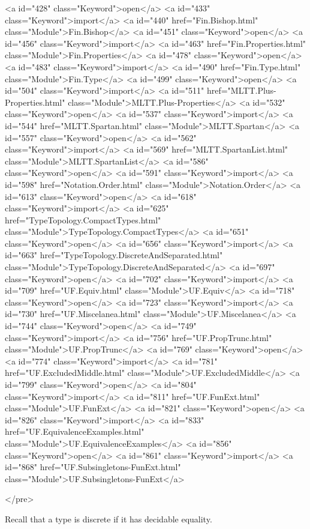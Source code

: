 <a id="428" class="Keyword">open</a> <a id="433" class="Keyword">import</a> <a id="440" href="Fin.Bishop.html" class="Module">Fin.Bishop</a>
<a id="451" class="Keyword">open</a> <a id="456" class="Keyword">import</a> <a id="463" href="Fin.Properties.html" class="Module">Fin.Properties</a>
<a id="478" class="Keyword">open</a> <a id="483" class="Keyword">import</a> <a id="490" href="Fin.Type.html" class="Module">Fin.Type</a>
<a id="499" class="Keyword">open</a> <a id="504" class="Keyword">import</a> <a id="511" href="MLTT.Plus-Properties.html" class="Module">MLTT.Plus-Properties</a>
<a id="532" class="Keyword">open</a> <a id="537" class="Keyword">import</a> <a id="544" href="MLTT.Spartan.html" class="Module">MLTT.Spartan</a>
<a id="557" class="Keyword">open</a> <a id="562" class="Keyword">import</a> <a id="569" href="MLTT.SpartanList.html" class="Module">MLTT.SpartanList</a>
<a id="586" class="Keyword">open</a> <a id="591" class="Keyword">import</a> <a id="598" href="Notation.Order.html" class="Module">Notation.Order</a>
<a id="613" class="Keyword">open</a> <a id="618" class="Keyword">import</a> <a id="625" href="TypeTopology.CompactTypes.html" class="Module">TypeTopology.CompactTypes</a>
<a id="651" class="Keyword">open</a> <a id="656" class="Keyword">import</a> <a id="663" href="TypeTopology.DiscreteAndSeparated.html" class="Module">TypeTopology.DiscreteAndSeparated</a>
<a id="697" class="Keyword">open</a> <a id="702" class="Keyword">import</a> <a id="709" href="UF.Equiv.html" class="Module">UF.Equiv</a>
<a id="718" class="Keyword">open</a> <a id="723" class="Keyword">import</a> <a id="730" href="UF.Miscelanea.html" class="Module">UF.Miscelanea</a>
<a id="744" class="Keyword">open</a> <a id="749" class="Keyword">import</a> <a id="756" href="UF.PropTrunc.html" class="Module">UF.PropTrunc</a>
<a id="769" class="Keyword">open</a> <a id="774" class="Keyword">import</a> <a id="781" href="UF.ExcludedMiddle.html" class="Module">UF.ExcludedMiddle</a>
<a id="799" class="Keyword">open</a> <a id="804" class="Keyword">import</a> <a id="811" href="UF.FunExt.html" class="Module">UF.FunExt</a>
<a id="821" class="Keyword">open</a> <a id="826" class="Keyword">import</a> <a id="833" href="UF.EquivalenceExamples.html" class="Module">UF.EquivalenceExamples</a>
<a id="856" class="Keyword">open</a> <a id="861" class="Keyword">import</a> <a id="868" href="UF.Subsingletons-FunExt.html" class="Module">UF.Subsingletons-FunExt</a>

</pre>

Recall that a type is discrete if it has decidable equality.

